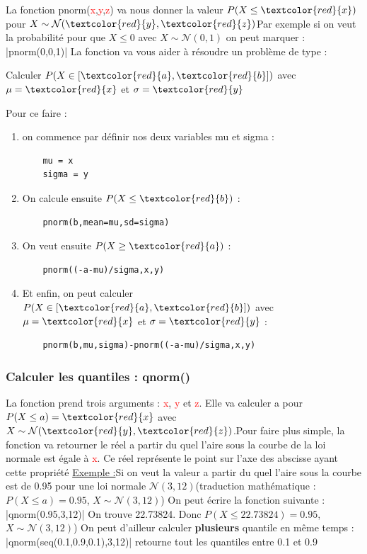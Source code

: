 \documentclass{article}
\newcommand{\argument}[1]{\textcolor{red}{#1}}
\begin{document}
La fonction pnorm(\argument{x},\argument{y},\argument{z}) va nous donner la valeur $P(X \leq \argument{x})$ pour $X \sim \mathcal{N}(\argument{y}, {\argument{z}})$\newline Par exemple si on veut la probabilité pour que $X\leq 0$ avec $X \sim \mathcal{N}(0, 1)$ on peut marquer : |pnorm(0,0,1)| 
\vspace{0.3cm}
La fonction va vous aider à résoudre un problème de type : 
\begin{center}
    Calculer $P(X \in [\argument{a},\argument{b}])$ avec $\mu = \argument{x}$ et $\sigma = \argument{y}$
\end{center}
Pour ce faire : 
\begin{enumerate}
    \item on commence par définir nos deux variables mu et sigma : 
    \begin{verbatim}
    mu = x
    sigma = y
    \end{verbatim}
    \item On calcule ensuite $P(X \leq \argument{b})$ : 
    \begin{verbatim}
    pnorm(b,mean=mu,sd=sigma)
    \end{verbatim}
    \item On veut ensuite $P(X \geq \argument{a})$ : 
    \begin{verbatim}
    pnorm((-a-mu)/sigma,x,y)
    \end{verbatim}
    \item Et enfin, on peut calculer $P(X \in [\argument{a},\argument{b}])$ avec $\mu = \argument{x}$ et $\sigma = \argument{y}$ : 
    \begin{verbatim}
    pnorm(b,mu,sigma)-pnorm((-a-mu)/sigma,x,y)
    \end{verbatim}
\end{enumerate}
\subsubsection{Calculer les quantiles : qnorm()}
La fonction prend trois arguments : \argument{x}, \argument{y} et \argument{z}. Elle va calculer a pour $P(X \leq a) = \argument{x}$ avec $X \sim \mathcal{N}(\argument{y}, {\argument{z}})$.\newline Pour faire plus simple, la fonction va retourner le réel a partir du quel l'aire sous la courbe de la loi normale est égale à \argument{x}. Ce réel représente le point sur l'axe des abscisse ayant cette propriété
\newline \underline{Exemple :}\newline Si on veut la valeur a partir du quel l'aire sous la courbe est de 0.95 pour une loi normale $\mathcal{N}(3, 12)$(traduction mathématique : $P(X \leq a) = 0.95$, $X \sim \mathcal{N}(3, 12)$)
On peut écrire la fonction suivante : 
|qnorm(0.95,3,12)|
On trouve 22.73824. Donc $P(X \leq 22.73824) = 0.95$, $X \sim \mathcal{N}(3, 12)$)
\newline On peut d'ailleur calculer \textbf{plusieurs} quantile en même temps : 
|qnorm(seq(0.1,0.9,0.1),3,12)|
retourne tout les quantiles entre 0.1 et 0.9
\newpage
\end{document}
